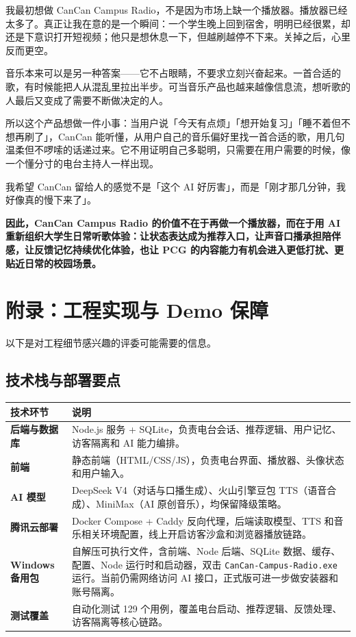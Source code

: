 \documentclass[UTF8,a4paper,11pt,fontset=windows]{ctexart}
\begin{document}
我最初想做 CanCan Campus Radio，不是因为市场上缺一个播放器。播放器已经太多了。真正让我在意的是一个瞬间：一个学生晚上回到宿舍，明明已经很累，却还是下意识打开短视频；他只是想休息一下，但越刷越停不下来。关掉之后，心里反而更空。

音乐本来可以是另一种答案——它不占眼睛，不要求立刻兴奋起来。一首合适的歌，有时候能把人从混乱里拉出半步。可当音乐产品也越来越像信息流，想听歌的人最后又变成了需要不断做决定的人。

所以这个产品想做一件小事：当用户说「今天有点烦」「想开始复习」「睡不着但不想再刷了」，CanCan 能听懂，从用户自己的音乐偏好里找一首合适的歌，用几句温柔但不啰嗦的话递过来。它不用证明自己多聪明，只需要在用户需要的时候，像一个懂分寸的电台主持人一样出现。

我希望 CanCan 留给人的感觉不是「这个 AI 好厉害」，而是「刚才那几分钟，我好像真的慢下来了」。

\textbf{因此，CanCan Campus Radio 的价值不在于再做一个播放器，而在于用 AI 重新组织大学生日常听歌体验：让状态表达成为推荐入口，让声音口播承担陪伴感，让反馈记忆持续优化体验，也让 PCG 的内容能力有机会进入更低打扰、更贴近日常的校园场景。}

\section{附录：工程实现与 Demo 保障}

以下是对工程细节感兴趣的评委可能需要的信息。

\subsection{技术栈与部署要点}

\begin{longtable}{>{\bfseries}p{3.3cm}p{11.3cm}}
\toprule
技术环节 & 说明 \\
\midrule
后端与数据库 & Node.js 服务 + SQLite，负责电台会话、推荐逻辑、用户记忆、访客隔离和 AI 能力编排。 \\
前端 & 静态前端（HTML/CSS/JS），负责电台界面、播放器、头像状态和用户输入。 \\
AI 模型 & DeepSeek V4（对话与口播生成）、火山引擎豆包 TTS（语音合成）、MiniMax（AI 原创音乐），均保留降级策略。 \\
腾讯云部署 & Docker Compose + Caddy 反向代理，后端读取模型、TTS 和音乐相关环境配置，线上开启访客沙盒和浏览器播放链路。 \\
Windows 备用包 & 自解压可执行文件，含前端、Node 后端、SQLite 数据、缓存、配置、Node 运行时和启动器，双击 \texttt{CanCan-Campus-Radio.exe} 运行。当前仍需网络访问 AI 接口，正式版可进一步做安装器和账号隔离。 \\
测试覆盖 & 自动化测试 129 个用例，覆盖电台启动、推荐逻辑、反馈处理、访客隔离等核心链路。 \\
\bottomrule
\end{longtable}
\end{document}
